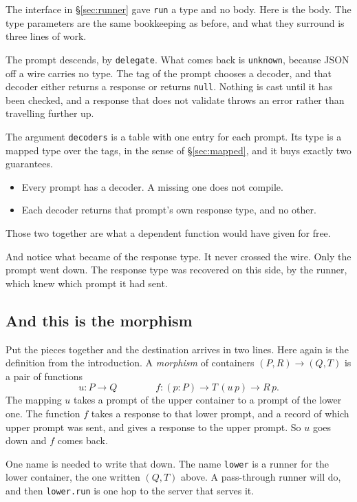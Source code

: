 \documentclass[11pt,a4paper]{article}
\begin{document}
The interface in \S\ref{sec:runner} gave \texttt{run} a type and no body. Here is the body. The
type parameters are the same bookkeeping as before, and what they surround is three lines of work.

The prompt descends, by \texttt{delegate}. What comes back is \texttt{unknown}, because JSON off a
wire carries no type. The tag of the prompt chooses a decoder, and that decoder either returns a
response or returns \texttt{null}. Nothing is cast until it has been checked, and a response that does not
validate throws an error rather than travelling further up.

The argument \texttt{decoders} is a table with one entry for each prompt. Its type is a mapped type
over the tags, in the sense of \S\ref{sec:mapped}, and it buys exactly two guarantees.

\begin{itemize}\setlength{\itemsep}{2pt}
\item Every prompt has a decoder. A missing one does not compile.
\item Each decoder returns that prompt's own response type, and no other.
\end{itemize}

Those two together are what a dependent function would have given for free.

And notice what became of the response type. It never crossed the wire. Only the prompt went down. The
response type was recovered on this side, by the runner, which knew which prompt it had sent.

\subsection{And this is the morphism}

Put the pieces together and the destination arrives in two lines. Here again is the definition from
the introduction. A \emph{morphism} of containers $(P,R) \to (Q,T)$ is a pair of functions
\[
  u : P \to Q
  \qquad\qquad
  f : (p : P) \to T\,(u\,p) \to R\,p .
\]
The mapping $u$ takes a prompt of the upper container to a prompt of the lower one. The function
$f$ takes a response to that lower prompt, and a record of which upper prompt was sent, and gives a
response to the upper prompt. So $u$ goes down and $f$ comes back.

One name is needed to write that down. The name \texttt{lower} is a runner for the lower container,
the one written $(Q,T)$ above. A pass-through runner will do, and then \texttt{lower.run} is one
hop to the server that serves it.
\end{document}
